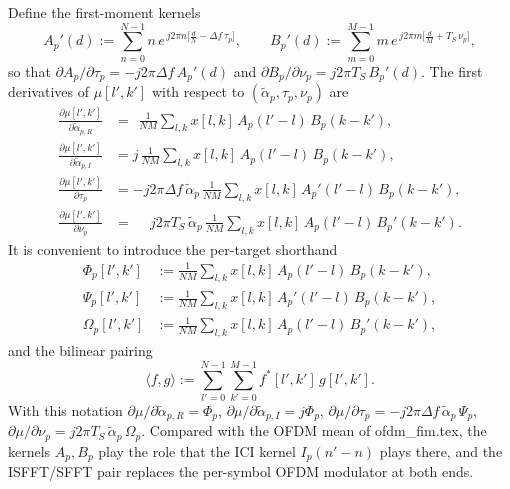 \documentclass[11pt]{article}
\begin{document}
Define the first-moment kernels
\begin{equation}
    A_p'(d) := \sum_{n=0}^{N-1} n\, e^{\,j2\pi n\bigl[\tfrac{d}{N} - \Delta f\,\tau_p\bigr]},
    \qquad
    B_p'(d) := \sum_{m=0}^{M-1} m\, e^{\,j2\pi m\bigl[\tfrac{d}{M} + T_S\,\nu_p\bigr]},
\end{equation}
so that
\(\partial A_p/\partial \tau_p = -j2\pi\Delta f\, A_p'(d)\) and
\(\partial B_p/\partial \nu_p =  j2\pi T_S\, B_p'(d)\). The first derivatives
of \(\mu[l',k']\) with respect to \((\tilde{\alpha}_p,\tau_p,\nu_p)\) are
\begin{align}
    \frac{\partial \mu[l',k']}{\partial \tilde{\alpha}_{p,R}} &=
        \phantom{j}\frac{1}{NM}\sum_{l,k} x[l,k]\, A_p(l'-l)\, B_p(k-k'), \\
    \frac{\partial \mu[l',k']}{\partial \tilde{\alpha}_{p,I}} &=
        j\,\frac{1}{NM}\sum_{l,k} x[l,k]\, A_p(l'-l)\, B_p(k-k'), \\
    \frac{\partial \mu[l',k']}{\partial \tau_p} &=
        -j2\pi\Delta f\, \tilde{\alpha}_p\,
        \frac{1}{NM}\sum_{l,k} x[l,k]\, A_p'(l'-l)\, B_p(k-k'), \\
    \frac{\partial \mu[l',k']}{\partial \nu_p} &=
        \phantom{-}j2\pi T_S\, \tilde{\alpha}_p\,
        \frac{1}{NM}\sum_{l,k} x[l,k]\, A_p(l'-l)\, B_p'(k-k').
\end{align}
It is convenient to introduce the per-target shorthand
\begin{align}
    \Phi_p[l',k']   &:= \frac{1}{NM}\sum_{l,k} x[l,k]\, A_p(l'-l)\, B_p(k-k'), \\
    \Psi_p[l',k']   &:= \frac{1}{NM}\sum_{l,k} x[l,k]\, A_p'(l'-l)\, B_p(k-k'), \\
    \Omega_p[l',k'] &:= \frac{1}{NM}\sum_{l,k} x[l,k]\, A_p(l'-l)\, B_p'(k-k'),
\end{align}
and the bilinear pairing
\begin{equation}
    \langle f, g \rangle := \sum_{l'=0}^{N-1}\sum_{k'=0}^{M-1} f^*[l',k']\, g[l',k'].
\end{equation}
With this notation
\(\partial \mu / \partial \tilde{\alpha}_{p,R} = \Phi_p\),
\(\partial \mu / \partial \tilde{\alpha}_{p,I} = j\Phi_p\),
\(\partial \mu / \partial \tau_p = -j2\pi\Delta f\, \tilde{\alpha}_p\,\Psi_p\),
\(\partial \mu / \partial \nu_p =  j2\pi T_S\,\tilde{\alpha}_p\,\Omega_p\).
Compared with the OFDM mean of ofdm\_fim.tex, the kernels \(A_p,B_p\)
play the role that the ICI kernel \(I_p(n'-n)\) plays there, and the
ISFFT/SFFT pair replaces the per-symbol OFDM modulator at both ends.
\end{document}
